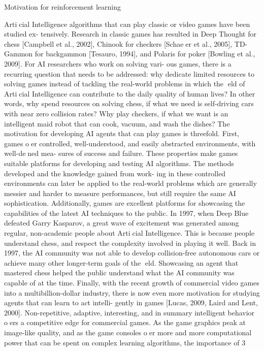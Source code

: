 Motivation for reinforcement learning

Articial Intelligence algorithms that can play classic or video games have been studied ex-
tensively. Research in classic games has resulted in Deep Thought for chess [Campbell et al., 2002],
Chinook for checkers [Schaeer et al., 2005], TD-Gammon for backgammon [Tesauro, 1994],
and Polaris for poker [Bowling et al., 2009]. For AI researchers who work on solving vari-
ous games, there is a recurring question that needs to be addressed: why dedicate limited
resources to solving games instead of tackling the real-world problems in which the eld of
Articial Intelligence can contribute to the daily quality of human lives? In other words,
why spend resources on solving chess, if what we need is self-driving cars with near zero
collision rates? Why play checkers, if what we want is an intelligent maid robot that can
cook, vacuum, and wash the dishes?
The motivation for developing AI agents that can play games is threefold. First, games
oer controlled, well-understood, and easily abstracted environments, with well-dened mea-
sures of success and failure. These properties make games suitable platforms for developing
and testing AI algorithms. The methods developed and the knowledge gained from work-
ing in these controlled environments can later be applied to the real-world problems which
are generally messier and harder to measure performances, but still require the same AI
sophistication.
Additionally, games are excellent platforms for showcasing the capabilities of the latest
AI techniques to the public. In 1997, when Deep Blue defeated Garry Kasparov, a great
wave of excitement was generated among regular, non-academic people about Articial
Intelligence. This is because people understand chess, and respect the complexity involved
in playing it well. Back in 1997, the AI community was not able to develop collision-free
autonomous cars or achieve many other longer-term goals of the eld. Showcasing an agent
that mastered chess helped the public understand what the AI community was capable of
at the time.
Finally, with the recent growth of commercial video games into a multibillion-dollar
industry, there is now even more motivation for studying agents that can learn to act intelli-
gently in games [Lucas, 2009, Laird and Lent, 2000]. Non-repetitive, adaptive, interesting,
and in summary intelligent behavior oers a competitive edge for commercial games. As
the game graphics peak at image-like quality, and as the game consoles oer more and more
computational power that can be spent on complex learning algorithms, the importance of
3


